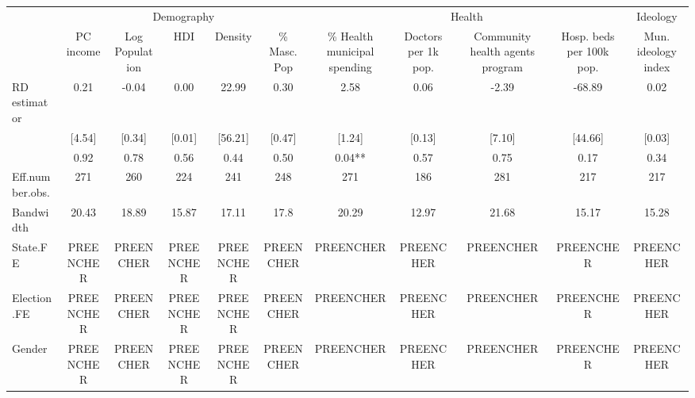 \captionsetup[table]{labelformat=empty,skip=1pt}
\begin{longtable}{lcccccccccc}
\toprule
 & \multicolumn{5}{c}{Demography} & \multicolumn{4}{c}{Health} & Ideology \\ 
\cmidrule(lr){2-6} \cmidrule(lr){7-10} \cmidrule(lr){11-11}
  & PC income & Log Population & HDI & Density & \% Masc. Pop & \% Health municipal spending & Doctors per 1k pop. & Community health agents program & Hosp. beds per 100k pop. & Mun. ideology index \\ 
\midrule
RD estimator & 0.21 & -0.04 & 0.00 & 22.99 & 0.30 & 2.58 & 0.06 & -2.39 & -68.89 & 0.02 \\ 
 & [4.54] & [0.34] & [0.01] & [56.21] & [0.47] & [1.24] & [0.13] & [7.10] & [44.66] & [0.03] \\ 
 & 0.92 & 0.78 & 0.56 & 0.44 & 0.50 & 0.04** & 0.57 & 0.75 & 0.17 & 0.34 \\ 
Eff.number.obs. & 271 & 260 & 224 & 241 & 248 & 271 & 186 & 281 & 217 & 217 \\ 
Bandwidth & 20.43 & 18.89 & 15.87 & 17.11 & 17.8 & 20.29 & 12.97 & 21.68 & 15.17 & 15.28 \\ 
State.FE & PREENCHER & PREENCHER & PREENCHER & PREENCHER & PREENCHER & PREENCHER & PREENCHER & PREENCHER & PREENCHER & PREENCHER \\ 
Election.FE & PREENCHER & PREENCHER & PREENCHER & PREENCHER & PREENCHER & PREENCHER & PREENCHER & PREENCHER & PREENCHER & PREENCHER \\ 
Gender & PREENCHER & PREENCHER & PREENCHER & PREENCHER & PREENCHER & PREENCHER & PREENCHER & PREENCHER & PREENCHER & PREENCHER \\ 
\bottomrule
\end{longtable}

